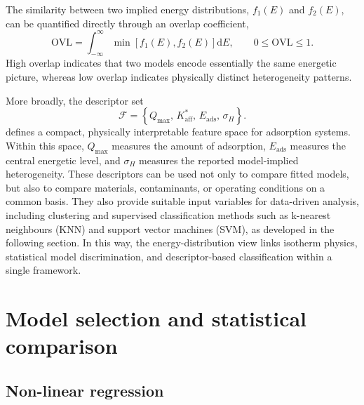 \documentclass[journal=jacsat,manuscript=article]{achemso}
\begin{document}
	The similarity between two implied energy distributions, $f_1(E)$ and $f_2(E)$, can be quantified directly through an overlap coefficient,
	\begin{equation}
		\mathrm{OVL}
		=
		\int_{-\infty}^{\infty}
		\min\!\left[f_1(E),f_2(E)\right]\mathrm{d}E,
		\qquad
		0 \leq \mathrm{OVL} \leq 1.
		\label{eq:ovl_main}
	\end{equation}
	High overlap indicates that two models encode essentially the same energetic picture, whereas low overlap indicates physically distinct heterogeneity patterns. %
	
	More broadly, the descriptor set
		\begin{equation}
			\mathcal{F}
			=
			\left\{
			Q_{\max},\,
			K_{\mathrm{aff}}^{\ast},\,
			E_{\mathrm{ads}},\,
			\sigma_H
			\right\}.
			\label{eq:reporting_fingerprint}
		\end{equation}
	defines a compact, physically interpretable feature space for adsorption systems. Within this space, $Q_{\max}$ measures the amount of adsorption, $E_{\mathrm{ads}}$ measures the central energetic level, and $\sigma_H$ measures the reported model-implied heterogeneity. These descriptors can be used not only to compare fitted models, but also to compare materials, contaminants, or operating conditions on a common basis. They also provide suitable input variables for data-driven analysis, including clustering and supervised classification methods such as k-nearest neighbours (KNN) and support vector machines (SVM), as developed in the following section. In this way, the energy-distribution view links isotherm physics, statistical model discrimination, and descriptor-based classification within a single framework.
	\section{Model selection and statistical comparison}
	\label{sec:model_selection}

	\subsection{Non-linear regression}
	\label{sec:fitting}
\end{document}
